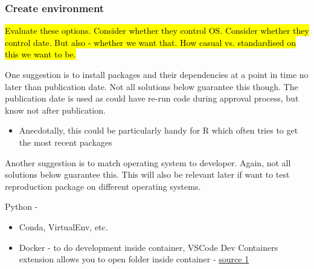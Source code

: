 \subsubsection{Create environment}
\timeyes

\hl{Evaluate these options. Consider whether they control OS. Consider whether they control date. But also - whether we want that. How casual vs. standardised on this we want to be.}

One suggestion is to install packages and their dependencies at a point in time no later than publication date. Not all solutions below guarantee this though. The publication date is used as could have re-run code during approval process, but know not after publication.
\begin{itemize}
    \item Anecdotally, this could be particularly handy for R which often tries to get the most recent packages
\end{itemize}

Another suggestion is to match operating system to developer. Again, not all solutions below guarantee this. This will also be relevant later if want to test reproduction package on different operating systems.

Python -
\begin{itemize}
    \item Conda, VirtualEnv, etc.
    \item Docker - to do development inside container, VSCode Dev Containers extension allows you to open folder inside container - \href{https://code.visualstudio.com/docs/devcontainers/containers}{source 1}
\end{itemize}

